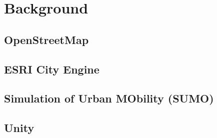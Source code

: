 \chapter{Background}
\label{ch:background}

\section{OpenStreetMap}
\label{ch:osm}

\section{ESRI City Engine}
\label{ch:ce}

\section{Simulation of Urban MObility (SUMO)}
\label{ch:sumo}

\section{Unity}
\label{ch:unity}
